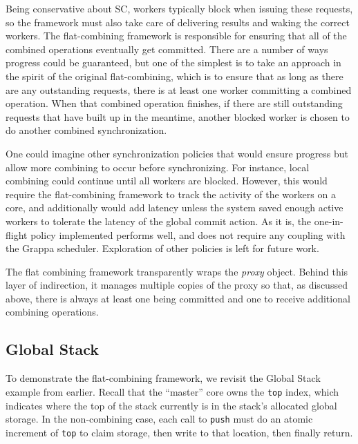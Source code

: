 Being conservative about SC, workers typically block when issuing these requests, so the framework must also take care of delivering results and waking the correct workers. The flat-combining framework is responsible for ensuring that all of the combined operations eventually get committed. There are a number of ways progress could be guaranteed, but one of the simplest is to take an approach in the spirit of the original flat-combining, which is to ensure that as long as there are any outstanding requests, there is at least one worker committing a combined operation. When that combined operation finishes, if there are still outstanding requests that have built up in the meantime, another blocked worker is chosen to do another combined synchronization.

One could imagine other synchronization policies that would ensure progress but allow more combining to occur before synchronizing. For instance, local combining could continue until all workers are blocked. However, this would require the flat-combining framework to track the activity of the workers on a core, and additionally would add latency unless the system saved enough active workers to tolerate the latency of the global commit action. As it is, the one-in-flight policy implemented performs well, and does not require any coupling with the Grappa scheduler. Exploration of other policies is left for future work.

The flat combining framework transparently wraps the \emph{proxy} object. Behind this layer of indirection, it manages multiple copies of the proxy so that, as discussed above, there is always at least one being committed and one to receive additional combining operations.


\subsection{Global Stack}
To demonstrate the flat-combining framework, we revisit the Global Stack example from earlier. Recall that the ``master'' core owns the \texttt{top} index, which indicates where the top of the stack currently is in the stack's allocated global storage. In the non-combining case, each call to \texttt{push} must do an atomic increment of \texttt{top} to claim storage, then write to that location, then finally return. 



